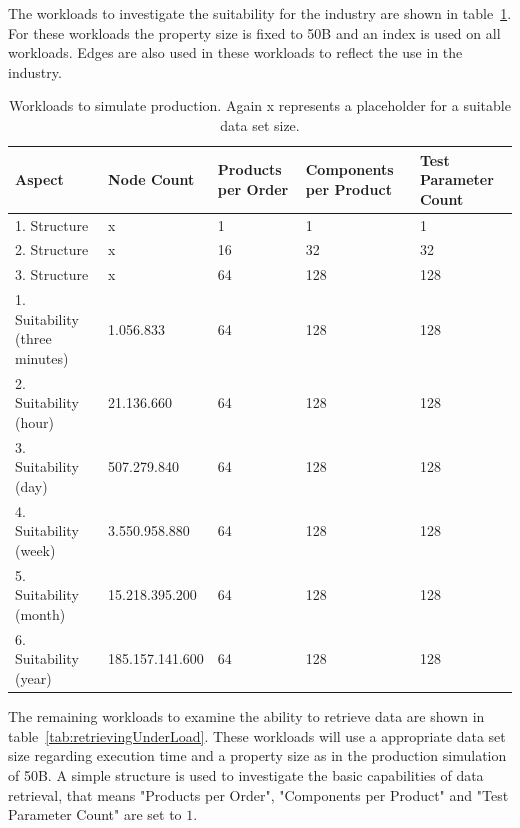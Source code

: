 The workloads to investigate the suitability for the industry are shown in table~\ref{tab:productionSimulation}.
For these workloads the property size is fixed to 50B and an index is used on all workloads.
Edges are also used in these workloads to reflect the use in the industry.

\begin{table}[!h]
  \begin{minipage}{\textwidth}
    \begin{tabularx}{\textwidth}{ | X | X | X | X | X | }
      \hline
      Aspect & Node Count & Products per Order & Components per Product & Test Parameter Count \\ \hline
      1. Structure & x & 1 & 1 & 1 \\ \hline
      2. Structure & x & 16 & 32 & 32 \\ \hline
      3. Structure & x & 64 & 128 & 128 \\ \hline
      1. Suitability (three minutes) & 1.056.833 & 64 & 128 & 128 \\ \hline
      2. Suitability (hour) & 21.136.660 & 64 & 128 & 128 \\ \hline
      3. Suitability (day) & 507.279.840 & 64 & 128 & 128 \\ \hline
      4. Suitability (week) & 3.550.958.880 & 64 & 128 & 128 \\ \hline
      5. Suitability (month) & 15.218.395.200 & 64 & 128 & 128 \\ \hline
      6. Suitability (year) & 185.157.141.600 & 64 & 128 & 128 \\ \hline
    \end{tabularx}
  \end{minipage}
  \caption{Workloads to simulate production. Again x represents a placeholder for a suitable data set size.}
  \label{tab:productionSimulation}
\end{table}

The remaining workloads to examine the ability to retrieve data are shown in table~\ref{tab:retrievingUnderLoad}.
These workloads will use a appropriate data set size regarding execution time and a property size as in the production simulation of 50B.
A simple structure is used to investigate the basic capabilities of data retrieval,
that means "Products per Order",
"Components per Product" and "Test Parameter Count" are set to $ 1 $.

